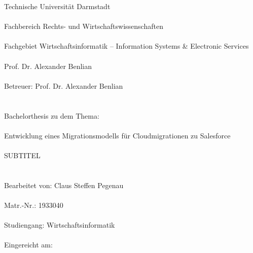 %
%
%
%

\singlespacing 
\noindent Technische Universität Darmstadt \\\\
Fachbereich Rechts- und Wirtschaftswissenschaften \\\\
Fachgebiet Wirtschaftsinformatik -- Information Systems \& Electronic Services \\\\
Prof. Dr. Alexander Benlian \\\\
Betreuer: Prof. Dr. Alexander Benlian \\\\
\\
Bachelorthesis zu dem Thema: \\\\
Entwicklung eines Migrationsmodells für Cloudmigrationen zu Salesforce \\\\ 
\lbrack SUBTITEL\rbrack \\\\
\\
Bearbeitet von: Claus Steffen Pegenau \\\\
Matr.-Nr.: 1933040 \\\\
Studiengang: Wirtschaftsinformatik \\\\
Eingereicht am: \abgabedatum \\\\

\onehalfspacing

\setcounter{page}{2}